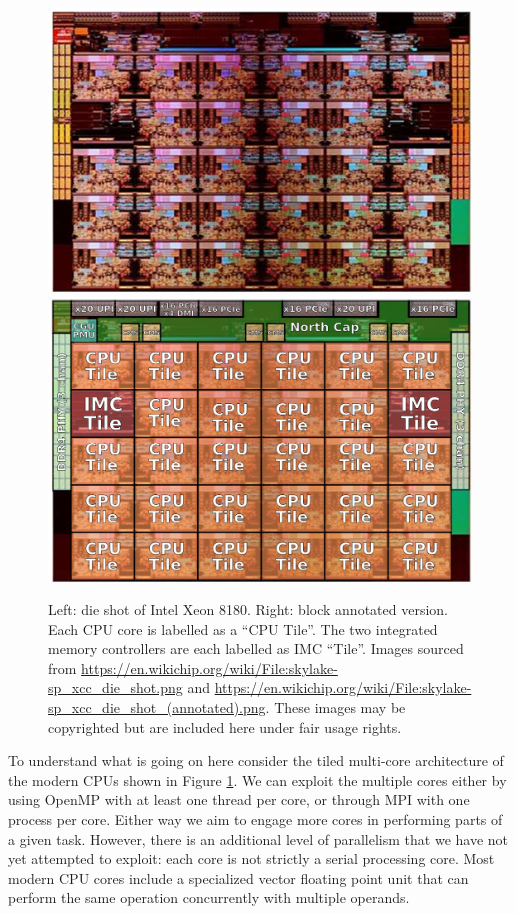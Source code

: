 \begin{figure}
    \begin{center}
    \includegraphics[width=0.45\linewidth]{figures/L14/skylakespxccdieshot.png}
    \includegraphics[width=0.45\linewidth]{figures/L14/skylakespxccdieshotannotated.png}
    \end{center}
    \caption{Left: die shot of Intel Xeon 8180. Right: block annotated version. Each CPU core is  labelled as a ``CPU Tile''. The two integrated memory controllers are each labelled as IMC ``Tile''.  Images sourced from \href{https://en.wikichip.org/wiki/File:skylake-sp_xcc_die_shot.png}{https://en.wikichip.org/wiki/File:skylake-sp\_xcc\_die\_shot.png} and \href{https://en.wikichip.org/wiki/File:skylake-sp_xcc_die_shot_(annotated).png}{https://en.wikichip.org/wiki/File:skylake-sp\_xcc\_die\_shot\_(annotated).png}. These images may be copyrighted but are included here under fair usage rights. }
    \label{skylakeDieshotV2.fig}
\end{figure}


To understand what is going on here consider the tiled multi-core architecture of the modern CPUs shown in Figure \ref{skylakeDieshotV2.fig}. We can exploit the multiple cores either by using OpenMP with at least one thread per core, or through MPI with one process per core. Either way we aim to engage more cores in performing parts of a given task. However, there is an additional level of parallelism that we have not yet attempted to exploit: each core is not strictly a serial processing core. Most modern CPU cores include a specialized vector floating point unit that can perform the same operation concurrently with multiple operands. 

\fi 
